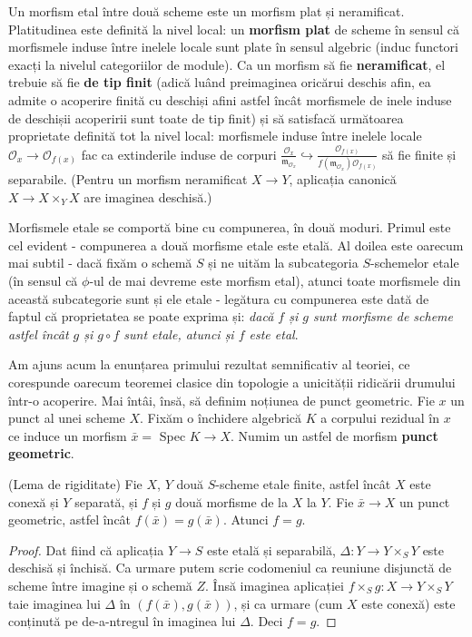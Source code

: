 \documentclass[13pt,openany]{book}
\begin{document}
Un morfism etal între două scheme este un morfism plat și neramificat. Platitudinea este definită la nivel local: un {\bf morfism plat} de scheme în sensul că morfismele induse între inelele locale sunt plate în sensul algebric (induc functori exacți la nivelul categoriilor de module). Ca un morfism să fie {\bf neramificat}, el trebuie să fie {\bf de tip finit} (adică luând preimaginea oricărui deschis afin, ea admite o acoperire finită cu deschiși afini astfel încât morfismele de inele induse de deschișii acoperirii sunt toate de tip finit) și să satisfacă următoarea proprietate definită tot la nivel local: morfismele induse între inelele locale $\mathcal{O}_x \rightarrow \mathcal{O}_{f(x)}$ fac ca extinderile induse de corpuri $\frac{\mathcal{O}_x}{\mathfrak{m}_{\mathcal{O}_x}} \hookrightarrow \frac{\mathcal{O}_{f(x)}}{f(\mathfrak{m}_{\mathcal{O}_x})\mathcal{O}_{f(x)}}$ să fie finite și separabile. (Pentru un morfism neramificat $X \rightarrow Y$, aplicația canonică $X \rightarrow X\times_Y X$ are imaginea deschisă.)

Morfismele etale se comportă bine cu compunerea, în două moduri. Primul este cel evident - compunerea a două morfisme etale este etală. Al doilea este oarecum mai subtil - dacă fixăm o schemă $S$ și ne uităm la subcategoria $S$-schemelor etale (în sensul că $\phi$-ul de mai devreme este morfism etal), atunci toate morfismele din această subcategorie sunt și ele etale - legătura cu compunerea este dată de faptul că proprietatea se poate exprima și: {\it dacă $f$ și $g$ sunt morfisme de scheme astfel încât $g$ și $g \circ f$ sunt etale, atunci și $f$ este etal}.

Am ajuns acum la enunțarea primului rezultat semnificativ al teoriei, ce corespunde oarecum teoremei clasice din topologie a unicității ridicării drumului într-o acoperire. Mai întâi, însă, să definim noțiunea de punct geometric. Fie $x$ un punct al unei scheme $X$. Fixăm o închidere algebrică $K$ a corpului rezidual în $x$ ce induce un morfism $\bar{x}=$ Spec $K\rightarrow X$. Numim un astfel de morfism {\bf punct geometric}.

\begin{lema}
(Lema de rigiditate) Fie $X$, $Y$ două $S$-scheme etale finite, astfel încât $X$ este conexă și $Y$ separată, și $f$ și $g$ două morfisme de la $X$ la $Y$. Fie $\bar{x} \rightarrow X$ un punct geometric, astfel încât $f(\bar{x})=g(\bar{x})$. Atunci $f=g$.
\end{lema}

\begin{proof}
Dat fiind că aplicația $Y \rightarrow S$ este etală și separabilă, $\Delta : Y \rightarrow Y \times_S Y$ este deschisă și închisă. Ca urmare putem scrie codomeniul ca reuniune disjunctă de scheme între imagine și o schemă $Z$. Însă imaginea aplicației $f \times_S g: X \rightarrow Y \times_S Y$ taie imaginea lui $\Delta$ în $(f(\bar{x}),g(\bar{x}))$, și ca urmare (cum $X$ este conexă) este conținută pe de-a-ntregul în imaginea lui $\Delta$. Deci $f=g$.
\end{proof}
\end{document}
